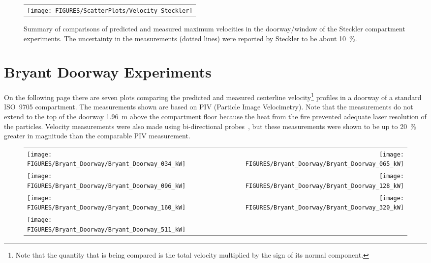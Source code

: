 \begin{figure}[p]
\begin{center}
\begin{tabular}{l}
\texttt{[image: FIGURES/ScatterPlots/Velocity\_Steckler]}
\end{tabular}
\end{center}
\caption[Summary of velocity predictions, Steckler compartment experiments.]
{Summary of comparisons of predicted and measured maximum velocities in the doorway/window of the Steckler compartment experiments. The uncertainty
in the measurements (dotted lines) were reported by Steckler to be about 10~\%.}
\label{Steckler_Scatterplot}
\end{figure}


\clearpage

\section{Bryant Doorway Experiments}

On the following page there are seven plots comparing the predicted and measured centerline velocity\footnote{Note that the quantity 
that is being compared is the total velocity multiplied by the sign of its normal component.} profiles
in a doorway of a standard ISO~9705 compartment. The measurements shown are based on PIV (Particle Image Velocimetry).
Note that the measurements do not extend to the top of the
doorway 1.96~m above the compartment floor because the heat from the fire prevented adequate laser resolution of
the particles. Velocity measurements were also made using bi-directional probes~\cite{Bryant:FSJ2009}, but these
measurements were shown to be up to 20~\% greater in magnitude than the comparable PIV measurement.



\begin{figure}[p]
\begin{tabular*}{\textwidth}{l@{\extracolsep{\fill}}r}
\texttt{[image: FIGURES/Bryant\_Doorway/Bryant\_Doorway\_034\_kW]} &
\texttt{[image: FIGURES/Bryant\_Doorway/Bryant\_Doorway\_065\_kW]} \\
\texttt{[image: FIGURES/Bryant\_Doorway/Bryant\_Doorway\_096\_kW]} &
\texttt{[image: FIGURES/Bryant\_Doorway/Bryant\_Doorway\_128\_kW]} \\
\texttt{[image: FIGURES/Bryant\_Doorway/Bryant\_Doorway\_160\_kW]} &
\texttt{[image: FIGURES/Bryant\_Doorway/Bryant\_Doorway\_320\_kW]} \\
\texttt{[image: FIGURES/Bryant\_Doorway/Bryant\_Doorway\_511\_kW]} &
\end{tabular*}
\label{Bryant_Doorway}
\end{figure}


